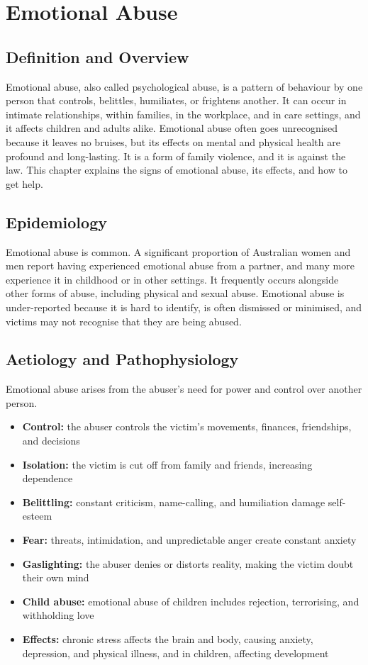 \chapter{Emotional Abuse}

\section*{Definition and Overview}
Emotional abuse, also called psychological abuse, is a pattern of behaviour by one person that controls, belittles, humiliates, or frightens another. It can occur in intimate relationships, within families, in the workplace, and in care settings, and it affects children and adults alike. Emotional abuse often goes unrecognised because it leaves no bruises, but its effects on mental and physical health are profound and long-lasting. It is a form of family violence, and it is against the law. This chapter explains the signs of emotional abuse, its effects, and how to get help.

\section*{Epidemiology}
Emotional abuse is common. A significant proportion of Australian women and men report having experienced emotional abuse from a partner, and many more experience it in childhood or in other settings. It frequently occurs alongside other forms of abuse, including physical and sexual abuse. Emotional abuse is under-reported because it is hard to identify, is often dismissed or minimised, and victims may not recognise that they are being abused.

\section*{Aetiology and Pathophysiology}
Emotional abuse arises from the abuser's need for power and control over another person.
\begin{itemize}
    \item \textbf{Control:} the abuser controls the victim's movements, finances, friendships, and decisions
    \item \textbf{Isolation:} the victim is cut off from family and friends, increasing dependence
    \item \textbf{Belittling:} constant criticism, name-calling, and humiliation damage self-esteem
    \item \textbf{Fear:} threats, intimidation, and unpredictable anger create constant anxiety
    \item \textbf{Gaslighting:} the abuser denies or distorts reality, making the victim doubt their own mind
    \item \textbf{Child abuse:} emotional abuse of children includes rejection, terrorising, and withholding love
    \item \textbf{Effects:} chronic stress affects the brain and body, causing anxiety, depression, and physical illness, and in children, affecting development
\end{itemize}

